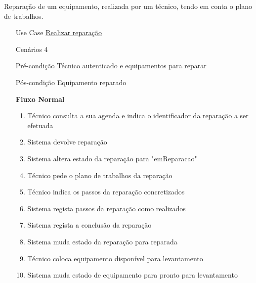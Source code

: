 \documentclass[../relatorio.tex]{subfiles}
\begin{document}
Reparação de um equipamento, realizada por um técnico, tendo em conta o plano de trabalhos.
\begin{itemize}
    \item[Use Case] {\underline{Realizar reparação}}
    \item[Cenários] {4}
    \item[Pré-condição] {Técnico autenticado e equipamentos para reparar}
    \item[Pós-condição] {Equipamento reparado}
          \begin{flushleft}
              \textbf{Fluxo Normal}
          \end{flushleft}
          \begin{enumerate}
              \item Técnico consulta a sua agenda e indica o identificador da reparação a ser efetuada
              \item Sistema devolve reparação
              \item Sistema altera estado da reparação para "emReparacao"
              \item Técnico pede o plano de trabalhos da reparação
              \item Técnico indica os passos da reparação concretizados
              \item Sistema regista passos da reparação como realizados
              \item Sistema regista a conclusão da reparação
              \item Sistema muda estado da reparação para reparada
              \item Técnico coloca equipamento disponível para levantamento
              \item Sistema muda estado de equipamento para pronto para levantamento
              

\end{enumerate}
\end{itemize}
\end{document}
